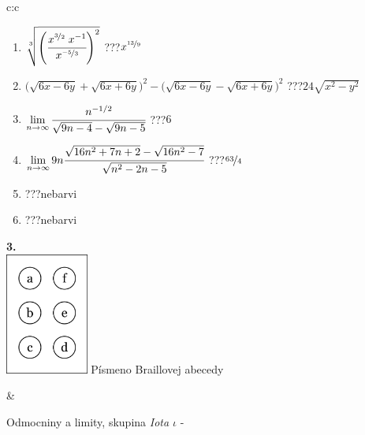 \documentclass[10pt]{report}
\begin{document}
\begin{tabular}{c:c}
\begin{minipage}[c][104.5mm][t]{0.5\linewidth}
\begin{center}
\begin{minipage}{0.79\linewidth}
\begin{center}
\begin{varwidth}{\linewidth}
\begin{enumerate}
\small
\item $\sqrt[3]{\left(\cfrac{x^{\nicefrac{3}{2}}\;x^{-1}}{x^{\nicefrac{-5}{3}}}\right)^{2}}$\quad \dotfill\; ???\;\dotfill \quad $x^{\nicefrac{13}{9}}$
\item {\footnotesize{\scriptsize$\big(\sqrt{6x-6y}+\sqrt{6x+6y}\big)^2-\big(\sqrt{6x-6y}-\sqrt{6x+6y}\big)^2$}\quad \dotfill\; ???\;\dotfill \quad $24\sqrt{x^2-y^2}$}
\item $\lim\limits_{n\to\infty}\cfrac{n^{-1/2}}{\sqrt{9n-4}-\sqrt{9n-5}}$\quad \dotfill\; ???\;\dotfill \quad $6$
\item $\lim\limits_{n\to\infty}9n\cfrac{\sqrt{16n^2+7n+2}-\sqrt{16n^2-7}}{\sqrt{n^2-2n-5}}$\quad \dotfill\; ???\;\dotfill \quad $\nicefrac{63}{4}$
\item \quad \dotfill\; ???\;\dotfill \quad nebarvi
\item \quad \dotfill\; ???\;\dotfill \quad nebarvi
\end{enumerate}
\end{varwidth}
\end{center}
\end{minipage}
\begin{minipage}{0.20\linewidth}
\begin{center}
{\Huge\bfseries 3.} \\[2mm]
\includegraphics[height=40mm]{../images/braille.png}
{\small Písmeno Braillovej abecedy}
\end{center}
\end{minipage}
\end{center}
\end{minipage}
&
\begin{minipage}[c][104.5mm][t]{0.5\linewidth}
\begin{center}
\vspace{7mm}
{\huge Odmocniny a limity, skupina \textit{Iota $\iota$} -}\\[5mm]

\end{center}
\end{minipage}
\end{tabular}
\end{document}
